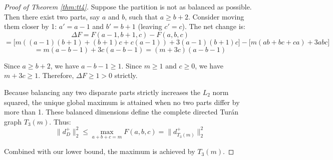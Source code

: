 \documentclass[10pt,a4paper]{amsart}
\begin{document}
\begin{proof}[Proof of Theorem \ref{thm:tt4}]
Suppose the partition is not as balanced as possible.
Then there exist two parts, say $a$ and $b$, such that $a \ge b + 2$.
Consider moving them closer by 1: $a' = a - 1$ and $b' = b + 1$ (leaving $c' = c$).
The net change is:
\[
\Delta F = F(a-1, b+1, c) - F(a,b,c)
\]
\[
= \big[m((a-1)(b+1) + (b+1)c + c(a-1)) + 3(a-1)(b+1)c\big] - \big[m(ab+bc+ca) + 3abc\big]
\]
\[
= m(a - b - 1) + 3c(a - b - 1) = (m + 3c)(a - b - 1)
\]

Since $a \ge b + 2$, we have $a - b - 1 \ge 1$.
Since $m \ge 1$ and $c \ge 0$, we have $m + 3c \ge 1$.
Therefore, $\Delta F \ge 1 > 0$ strictly.

Because balancing any two disparate parts strictly increases the $L_2$ norm squared, the unique global maximum is attained when no two parts differ by more than 1.
These balanced dimensions define the complete directed Tur\'an graph $T_3(m)$.
Thus:
\[
\|d^+_D\|_2^2 \le \max_{a+b+c=m} F(a,b,c) = \|d^+_{T_3(m)}\|_2^2
\]

Combined with our lower bound, the maximum is achieved by $T_3(m)$.
\end{proof}
\end{document}
